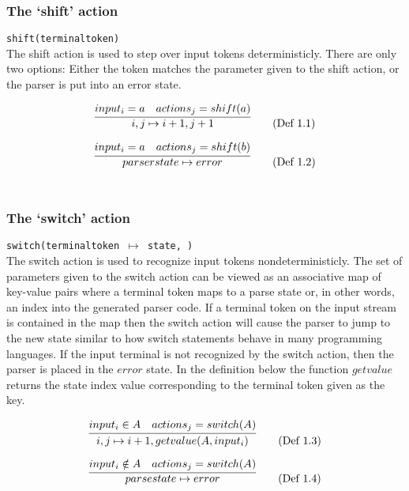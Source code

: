 \documentclass[11pt]{article}
\begin{document}
\subsubsection{The `shift' action}
\texttt{shift(terminaltoken)}\\
The shift action is used to step over input tokens deterministicly. 
There are only two options: Either the token matches the parameter given to the shift action, or the parser is put into an error state.

\begin{equation}
\infer{i, j \mapsto i+1, j+1}{input_i = a & actions_j = shift(a)} \tag{Def 1.1}
\end{equation}

\begin{equation}
\infer{parserstate \mapsto error}{input_i = a & actions_j = shift(b)} \tag{Def 1.2}
\end{equation}\\

\subsubsection{The `switch' action}
\texttt{switch(terminaltoken $\mapsto$ state, \textellipsis)}\\
The switch action is used to recognize input tokens nondeterministicly.
The set of parameters given to the switch action can be viewed as an associative map of key-value pairs where a terminal token maps to a parse state or, in other words, an index into the generated parser code.
If a terminal token on the input stream is contained in the map then the switch action will cause the parser to jump to the new state similar to how switch statements behave in many programming languages.
If the input terminal is not recognized by the switch action, then the parser is placed in the $error$ state. 
In the definition below the function $getvalue$ returns the state index value corresponding to the terminal token given as the key.

\begin{equation}
\infer{i, j \mapsto i+1, getvalue(A, input_i)}{input_i \in A & actions_j = switch(A)} \tag{Def 1.3}
\end{equation}

\begin{equation}
\infer{parsestate \mapsto error}{input_i \notin A & actions_j = switch(A)} \tag{Def 1.4}
\end{equation}\\
\end{document}
